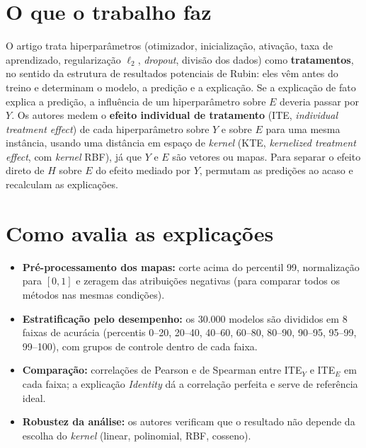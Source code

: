\documentclass[11pt,a4paper]{article}
\begin{document}
\section{O que o trabalho faz}
O artigo trata hiperparâmetros (otimizador, inicialização, ativação, taxa de aprendizado, regularização $\ell_2$, \textit{dropout}, divisão dos dados) como \textbf{tratamentos}, no sentido da estrutura de resultados potenciais de Rubin: eles vêm antes do treino e determinam o modelo, a predição e a explicação. Se a explicação de fato explica a predição, a influência de um hiperparâmetro sobre $E$ deveria passar por $Y$. Os autores medem o \textbf{efeito individual de tratamento} (ITE, \textit{individual treatment effect}) de cada hiperparâmetro sobre $Y$ e sobre $E$ para uma mesma instância, usando uma distância em espaço de \textit{kernel} (KTE, \textit{kernelized treatment effect}, com \textit{kernel} RBF), já que $Y$ e $E$ são vetores ou mapas. Para separar o efeito direto de $H$ sobre $E$ do efeito mediado por $Y$, permutam as predições ao acaso e recalculam as explicações.

\section{Como avalia as explicações}
\begin{itemize}
  \item \textbf{Pré-processamento dos mapas:} corte acima do percentil 99, normalização para $[0, 1]$ e zeragem das atribuições negativas (para comparar todos os métodos nas mesmas condições).
  \item \textbf{Estratificação pelo desempenho:} os 30.000 modelos são divididos em 8 faixas de acurácia (percentis 0--20, 20--40, 40--60, 60--80, 80--90, 90--95, 95--99, 99--100), com grupos de controle dentro de cada faixa.
  \item \textbf{Comparação:} correlações de Pearson e de Spearman entre ITE$_Y$ e ITE$_E$ em cada faixa; a explicação \textit{Identity} dá a correlação perfeita e serve de referência ideal.
  \item \textbf{Robustez da análise:} os autores verificam que o resultado não depende da escolha do \textit{kernel} (linear, polinomial, RBF, cosseno).
\end{itemize}
\end{document}
